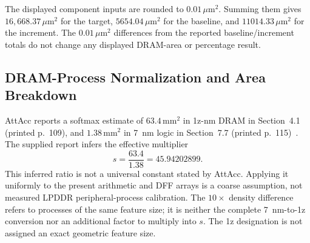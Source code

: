 The displayed component inputs are rounded to $0.01\,\mu\mathrm{m}^{2}$. Summing them gives $16{,}668.37\,\mu\mathrm{m}^{2}$ for the target, $5654.04\,\mu\mathrm{m}^{2}$ for the baseline, and $11014.33\,\mu\mathrm{m}^{2}$ for the increment. The $0.01\,\mu\mathrm{m}^{2}$ differences from the reported baseline/increment totals do not change any displayed DRAM-area or percentage result.

\subsection{DRAM-Process Normalization and Area Breakdown}
AttAcc reports a softmax estimate of $63.4\,\mathrm{mm}^{2}$ in 1z-nm DRAM in Section~4.1 (printed p.~109), and $1.38\,\mathrm{mm}^{2}$ in 7~nm logic in Section~7.7 (printed p.~115)~\cite{attacc}. The supplied report infers the effective multiplier
\[
s=\frac{63.4}{1.38}=45.94202899.
\]
This inferred ratio is not a universal constant stated by AttAcc. Applying it uniformly to the present arithmetic and DFF arrays is a coarse assumption, not measured LPDDR peripheral-process calibration. The $10\times$ density difference refers to processes of the same feature size; it is neither the complete 7~nm-to-1z conversion nor an additional factor to multiply into $s$. The 1z designation is not assigned an exact geometric feature size.

